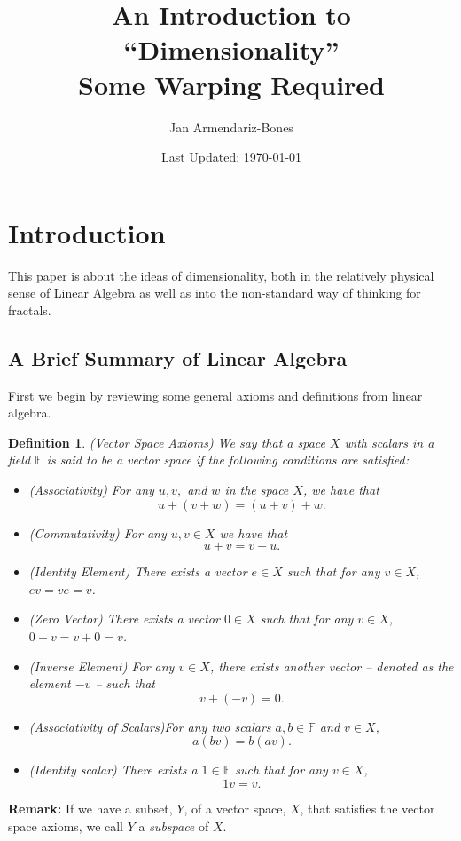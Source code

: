 \documentclass{article}
\title{An Introduction to ``Dimensionality''\\Some Warping Required}
\author{Jan Armendariz-Bones}
\date{Last Updated: \today}
\newtheorem{definition}{Definition}
\begin{document}
\maketitle
\tableofcontents
\section{Introduction}
This paper is about the ideas of dimensionality, both in the relatively physical sense of Linear Algebra as well as into the non-standard way of thinking for fractals.
\subsection{A Brief Summary of Linear Algebra}
First we begin by reviewing some general axioms and definitions from linear algebra.

\begin{definition} (Vector Space Axioms)
		We say that a space $X$ with scalars in a field $\mathbb{F}$ is said to be a vector space if the following conditions are satisfied:
		\begin{itemize}
				\item (Associativity) For any $u,v,$ and $w$ in the space $X$, we have that \[u+(v+w)=(u+v)+w.\]
				\item (Commutativity) For any $u,v\in X$ we have that \[u+v=v+u.\]
				\item (Identity Element) There exists a vector $e\in X$ such that for any $v\in X$, $ev=ve=v$.
				\item (Zero Vector) There exists a vector $0\in X$ such that for any $v\in X$, $0+v=v+0=v$.   
				\item (Inverse Element) For any $v\in X$, there exists another vector -- denoted as the element $-v$ -- such that
						\[
								v+(-v)=0.
						\]
				\item (Associativity of Scalars)For any two scalars $a,b\in\mathbb{F}$ and $v\in X$,
						\[
								a(bv) = b(av).
						\]
		\item (Identity scalar) There exists a $1\in\mathbb{F}$ such that for any $v\in X$, \[1v=v.\] 
		\end{itemize}	
\end{definition}	
\noindent\textbf{Remark:} If we have a subset, $Y$,  of a vector space, $X$,  that satisfies the vector space axioms, we call $Y$ a \emph{subspace} of $X$. 
\end{document}
